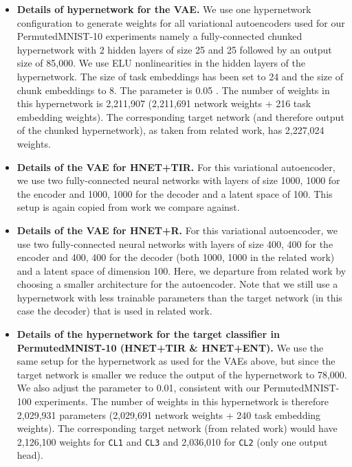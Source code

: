 \documentclass{article}
\begin{document}
\begin{itemize}
    \item \textbf{Details of hypernetwork for the VAE.} \label{apx:hnet_config_vae}
    We use one hypernetwork configuration to generate weights for all variational autoencoders used for our PermutedMNIST-10 experiments namely a fully-connected chunked hypernetwork with 2 hidden layers of size 25 and 25 followed by an output size of 85,000. We use ELU nonlinearities in the hidden layers of the hypernetwork. The size of task embeddings  has been set to 24 and the size of chunk embeddings  to 8. The parameter  is 0.05
. The number of weights in this hypernetwork  is 2,211,907 (2,211,691 network weights + 216 task embedding weights). The corresponding target network (and therefore output of the chunked hypernetwork), as taken from related work, has 2,227,024 weights.
    
    \item \textbf{Details of the VAE for HNET+TIR.} 
    For this variational  autoencoder, we use two
    fully-connected neural networks with layers of size 
    1000, 1000 for the encoder and 1000, 1000 for the decoder and a latent space of 100. This setup is again copied from work we compare against.
   
    \item \textbf{Details of the VAE for HNET+R.} For this variational autoencoder, we use two fully-connected neural networks with layers of size 
    400, 400 for the encoder and 400, 400 for the decoder (both 1000, 1000 in the related work) and a latent space of dimension 100. Here, we departure from related work by choosing a smaller architecture for the autoencoder. Note that we still use a hypernetwork with less trainable parameters than the target network (in this case the decoder) that is used in related work. 
    
     \item \textbf{Details of the hypernetwork for the target classifier in PermutedMNIST-10 (HNET+TIR \& HNET+ENT).}
     We use the same setup for the hypernetwork as used for the VAEs above, but since the target network is smaller we reduce the output of the hypernetwork to 78,000. We also adjust 
     the parameter  to 0.01, consistent with our PermutedMNIST-100 experiments.
      The number of weights in this hypernetwork is therefore 2,029,931 parameters (2,029,691 network weights + 240 task embedding weights). The corresponding target network (from related work) would have 2,126,100 weights for  \texttt{CL1} and  \texttt{CL3} and 2,036,010 for  \texttt{CL2} (only one output head).
     

\end{itemize}
\end{document}
